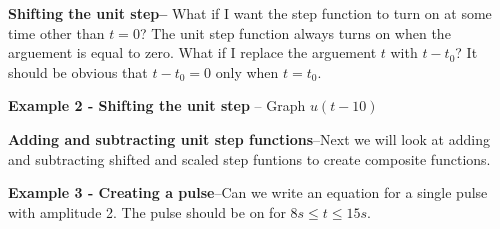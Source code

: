 \documentclass{handout}
\begin{document}
\textbf{Shifting the unit step--}  What if I want the step function to turn on at some time other than $t=0$? The unit step function always turns on when the arguement is equal to zero.  What if I replace the arguement $t$ with $t - t_0$? It should be obvious that $t-t_0=0$ only when $t=t_0$.

\newpage
\clearpage
\pagebreak

\textbf{Example 2 - Shifting the unit step} -- Graph $u(t-10)$



\textbf{Adding and subtracting unit step functions}--Next we will look at adding and subtracting shifted and scaled step funtions to create composite functions.  

\textbf{Example 3 - Creating a pulse}--Can we write an equation for a single pulse with amplitude 2.  The pulse should be on for $8s\le t\le 15s$.

\end{document}
